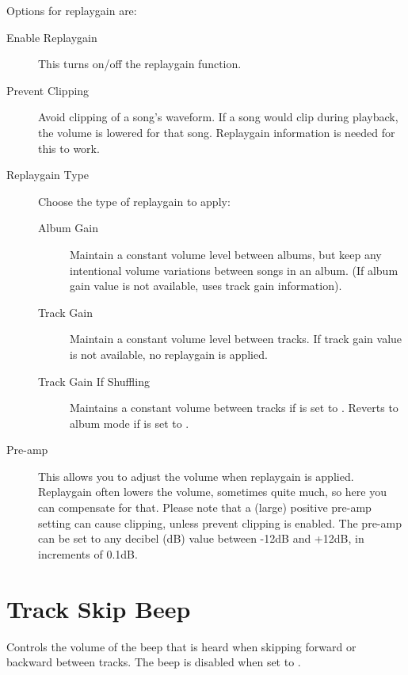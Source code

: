 {    Options for replaygain are:
    \begin{description}
      \item[Enable Replaygain]This turns on/off the replaygain function.
      \item[Prevent Clipping]Avoid clipping of a song's waveform.
        If a song would clip during playback, the volume is lowered for 
        that song. Replaygain information is needed for this to work.
      \item[Replaygain Type]Choose the type of replaygain to apply:
        \begin{description}
        \item[Album Gain]Maintain a constant volume level between
          albums, but keep any intentional volume variations between 
          songs in an album. (If album gain value is not available,
          uses track gain information).
        \item[Track Gain]Maintain a constant volume level between
          tracks. If track gain value is not available, no replaygain 
          is applied.
        \item[Track Gain If Shuffling]Maintains a constant volume
          between tracks if  is set to .
          Reverts to album mode if  is set to .
        \end{description}
      \item[Pre-amp]This allows you to adjust the volume when replaygain
        is applied. Replaygain often lowers the volume, sometimes quite
        much, so here you can compensate for that. Please note that a
        (large) positive pre-amp setting can cause clipping, unless
        prevent clipping is enabled.  The pre-amp can be set to any
        decibel (dB) value between -12dB and +12dB, in increments of 0.1{}dB.
      \end{description}

  \section{Track Skip Beep}
    Controls the volume of the beep that is heard when
    skipping forward or backward between tracks. The beep is disabled when
    set to .
}%



